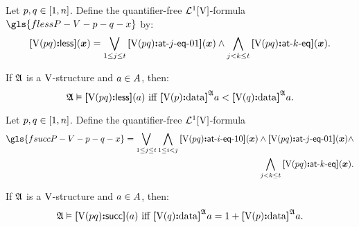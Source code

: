 \begin{definition}
Let $p, q \in [1, n]$. Define the quantifier-free
$\mathcal{L}^{1}[{\mathrm{V}}]$-formula $\gls{flessP-V-p-q-x}$ by:
\[
  {\bm{[}{\mathrm{V}}(pq)\mathord{\bm{:}} \mathsf{less}\bm{]}}(\bm{x}) = \bigvee_{1 \leq j \leq t}
  {\bm{[}{\mathrm{V}}(pq)\mathord{\bm{:}} \mathsf{at}{\hbox{-}}j{\hbox{-}}\mathsf{eq}{\hbox{-}}01 \bm{]}}(\bm{x}) \land \bigwedge_{j < k \leq t}
  {\bm{[}{\mathrm{V}}(pq)\mathord{\bm{:}} \mathsf{at}{\hbox{-}}k{\hbox{-}}\mathsf{eq} \bm{]}}(\bm{x}).
\]
\end{definition}
\begin{remark}
If $\mathfrak{A}$ is a ${\mathrm{V}}$-structure and $a \in A$,
then:
\[
  \miff{
  \StrA \vDash \flessP\VS\posp\posq(\ea)}{
  \data{\VSp\posp}\StrA\ea < \data{\VSp\posq}\StrA\ea}.
\]
\end{remark}

\begin{definition}
Let $p, q \in [1, n]$. Define the quantifier-free $\mathcal{L}^{1}[{\mathrm{V}}]$-formula
\begin{align*}
  \gls{fsuccP-V-p-q-x} =
  \bigvee_{1 \leq \jj \leq \tbit} \bigwedge_{1 \leq \ii < \jj}
  \feqPPIO\VS\posp\posq\ii(\xx) \land
  \feqPPOI\VS\posp\posq\jj(\xx) \land \\
  \bigwedge_{\jj < \kk \leq \tbit}
  \feqPP\VS\posp\posq\kk(\xx).
\end{align*}
\end{definition}
\begin{remark}
If $\mathfrak{A}$ is a ${\mathrm{V}}$-structure and $a \in A$,
then:
\[
  \miff{
  \StrA \vDash \fsuccP\VS\posp\posq(\ea)}{
  \data{\VSp\posq}\StrA\ea = 1 + \data{\VSp\posp}\StrA\ea}.
\]
\end{remark}